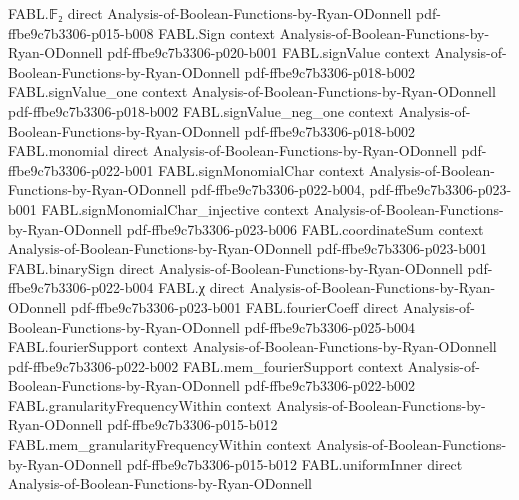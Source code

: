 \begin{theorem}
\label{FABL.mean_booleanFunction_eq_prob_one_sub_prob_neg_one}
\leanok
{}
\proofstep
  {FABL.𝔽₂}
  {direct}
  {Analysis-of-Boolean-Functions-by-Ryan-ODonnell}
  {pdf-ffbe9c7b3306-p015-b008}
\proofstep
  {FABL.Sign}
  {context}
  {Analysis-of-Boolean-Functions-by-Ryan-ODonnell}
  {pdf-ffbe9c7b3306-p020-b001}
\proofstep
  {FABL.signValue}
  {context}
  {Analysis-of-Boolean-Functions-by-Ryan-ODonnell}
  {pdf-ffbe9c7b3306-p018-b002}
\proofstep
  {FABL.signValue_one}
  {context}
  {Analysis-of-Boolean-Functions-by-Ryan-ODonnell}
  {pdf-ffbe9c7b3306-p018-b002}
\proofstep
  {FABL.signValue_neg_one}
  {context}
  {Analysis-of-Boolean-Functions-by-Ryan-ODonnell}
  {pdf-ffbe9c7b3306-p018-b002}
\proofstep
  {FABL.monomial}
  {direct}
  {Analysis-of-Boolean-Functions-by-Ryan-ODonnell}
  {pdf-ffbe9c7b3306-p022-b001}
\proofstep
  {FABL.signMonomialChar}
  {context}
  {Analysis-of-Boolean-Functions-by-Ryan-ODonnell}
  {pdf-ffbe9c7b3306-p022-b004,
    pdf-ffbe9c7b3306-p023-b001}
\proofstep
  {FABL.signMonomialChar_injective}
  {context}
  {Analysis-of-Boolean-Functions-by-Ryan-ODonnell}
  {pdf-ffbe9c7b3306-p023-b006}
\proofstep
  {FABL.coordinateSum}
  {context}
  {Analysis-of-Boolean-Functions-by-Ryan-ODonnell}
  {pdf-ffbe9c7b3306-p023-b001}
\proofstep
  {FABL.binarySign}
  {direct}
  {Analysis-of-Boolean-Functions-by-Ryan-ODonnell}
  {pdf-ffbe9c7b3306-p022-b004}
\proofstep
  {FABL.χ}
  {direct}
  {Analysis-of-Boolean-Functions-by-Ryan-ODonnell}
  {pdf-ffbe9c7b3306-p023-b001}
\proofstep
  {FABL.fourierCoeff}
  {direct}
  {Analysis-of-Boolean-Functions-by-Ryan-ODonnell}
  {pdf-ffbe9c7b3306-p025-b004}
\proofstep
  {FABL.fourierSupport}
  {context}
  {Analysis-of-Boolean-Functions-by-Ryan-ODonnell}
  {pdf-ffbe9c7b3306-p022-b002}
\proofstep
  {FABL.mem_fourierSupport}
  {context}
  {Analysis-of-Boolean-Functions-by-Ryan-ODonnell}
  {pdf-ffbe9c7b3306-p022-b002}
\proofstep
  {FABL.granularityFrequencyWithin}
  {context}
  {Analysis-of-Boolean-Functions-by-Ryan-ODonnell}
  {pdf-ffbe9c7b3306-p015-b012}
\proofstep
  {FABL.mem_granularityFrequencyWithin}
  {context}
  {Analysis-of-Boolean-Functions-by-Ryan-ODonnell}
  {pdf-ffbe9c7b3306-p015-b012}
\proofstep
  {FABL.uniformInner}
  {direct}
  {Analysis-of-Boolean-Functions-by-Ryan-ODonnell}

\end{theorem}
